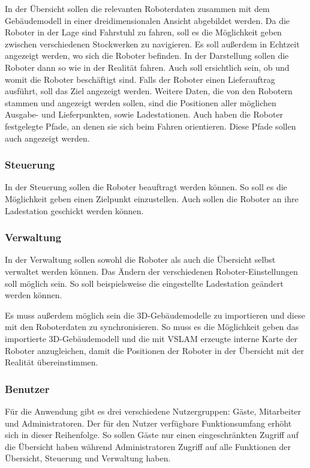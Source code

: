 In der Übersicht sollen die relevanten Roboterdaten zusammen mit dem Gebäudemodell in einer dreidimensionalen Ansicht abgebildet werden. Da die Roboter in der Lage sind Fahrstuhl zu fahren, soll es die Möglichkeit geben zwischen verschiedenen Stockwerken zu navigieren. Es soll außerdem in Echtzeit angezeigt werden, wo sich die Roboter befinden. In der Darstellung sollen die Roboter dann so wie in der Realität fahren. Auch soll ersichtlich sein, ob und womit die Roboter beschäftigt sind. Falls der Roboter einen Lieferauftrag ausführt, soll das Ziel angezeigt werden. Weitere Daten, die von den Robotern stammen und angezeigt werden sollen, sind die Positionen aller möglichen Ausgabe- und Lieferpunkten, sowie Ladestationen. Auch haben die Roboter festgelegte Pfade, an denen sie sich beim Fahren orientieren. Diese Pfade sollen auch angezeigt werden.

\subsubsection{Steuerung}

In der Steuerung sollen die Roboter beauftragt werden können. So soll es die Möglichkeit geben einen Zielpunkt einzustellen. Auch sollen die Roboter an ihre Ladestation geschickt werden können.

\subsubsection{Verwaltung}

In der Verwaltung sollen sowohl die Roboter als auch die Übersicht selbst verwaltet werden können. Das Ändern der verschiedenen Roboter-Einstellungen soll möglich sein. So soll beispielsweise die eingestellte Ladestation geändert werden können.

Es muss außerdem möglich sein die 3D-Gebäudemodelle zu importieren und diese mit den Roboterdaten zu synchronisieren. So muss es die Möglichkeit geben das importierte 3D-Gebäudemodell und die mit \ac{VSLAM} erzeugte interne Karte der Roboter anzugleichen, damit die Positionen der Roboter in der Übersicht mit der Realität übereinstimmen.

\subsubsection{Benutzer}

Für die Anwendung gibt es drei verschiedene Nutzergruppen: Gäste, Mitarbeiter und Administratoren. Der für den Nutzer verfügbare Funktionsumfang erhöht sich in dieser Reihenfolge. So sollen Gäste nur einen eingeschränkten Zugriff auf die Übersicht haben während Administratoren Zugriff auf alle Funktionen der Übersicht, Steuerung und Verwaltung haben.


